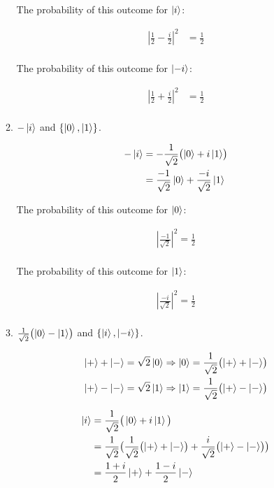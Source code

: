 \documentclass{article}
\begin{document}
\begin{enumerate}
\begin{enumerate}
The probability of this outcome for $\ket{i}$:

\begin{align*}
  |\frac{1}{2} - \frac{i}{2}|^2 &= \frac{1}{2} \\
\end{align*}

The probability of this outcome for $\ket{-i}$:

\begin{align*}
  |\frac{1}{2} + \frac{i}{2}|^2 &= \frac{1}{2} \\
\end{align*}


		\item $-\ket{i}$ and $\{\ket0, \ket1\}$.


\begin{align*}
	-\ket{i} &= -\frac{1}{\sqrt{2}} \bigl(\ket{0} + i\ket{1}\bigr) \\
	&= \frac{-1}{\sqrt{2}}\ket{0} + \frac{-i}{\sqrt{2}} \ket{1}
\end{align*}

The probability of this outcome for $\ket{0}$:

\begin{align*}
  |\frac{-1}{\sqrt{2}}|^2 = \frac{1}{2} \\ 
\end{align*}

The probability of this outcome for $\ket{1}$:

\begin{align*}
  |\frac{-i}{\sqrt{2}}|^2 = \frac{1}{2} \\
\end{align*}

		\item $ \frac{1}{\sqrt{2}} \bigl( \ket{0} - \ket{1} \bigr) $ and $\{\ket{i}, \ket{-i}\}$.

\begin{align*}
	\ket{+} + \ket{-} = \sqrt{2} \ket{0} \Rightarrow \ket{0} = \frac{1}{\sqrt{2}} \bigl(\ket{+} + \ket{-}\bigr) \\
	\ket{+} - \ket{-} = \sqrt{2} \ket{1} \Rightarrow \ket{1} = \frac{1}{\sqrt{2}} \bigl(\ket{+} - \ket{-}\bigr) \\
\end{align*}

\begin{align*}
	\ket{i} &= \frac{1}{\sqrt{2}} \bigr(\ket{0} + i\ket{1} \bigl) \\
	&= \frac{1}{\sqrt{2}} \bigl(\frac{1}{\sqrt{2}} \bigl(\ket{+} + \ket{-} \bigr) + \frac{i}{\sqrt{2}} \bigl(\ket{+} - \ket{-} \bigr) \bigr) \\
	&= \frac{1 + i}{2}\ket{+} + \frac{1 - i}{2} \ket{-}
\end{align*}


\end{enumerate}
\end{enumerate}
\end{document}
